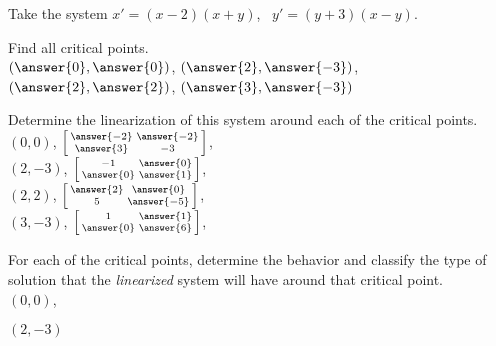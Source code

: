 \documentclass{ximera}
\begin{document}
\begin{exercise}
    Take the system $x' = (x-2)(x+y)$, \ $y' = (y+3)(x-y)$.
    
    Find all critical points.\\
    $\left(\answer{0}, \answer{0}\right)$, $\left(\answer{2}, \answer{-3}\right)$, $\left(\answer{2}, \answer{2}\right)$, $\left(\answer{3}, \answer{-3}\right)$
    \begin{problem}
        Determine the linearization of this system around each of the critical points.\\
            $(0,0)$, $\left[\begin{smallmatrix} \answer{-2} & \answer{-2} \\ \answer{3} & -3 \end{smallmatrix}\right]$, \\ 
            $(2, -3)$, $\left[\begin{smallmatrix} -1 & \answer{0} \\ \answer{0} & \answer{1} \end{smallmatrix}\right]$, \\ 
            $(2, 2)$, $\left[\begin{smallmatrix} \answer{2} & \answer{0} \\ 5 & \answer{-5} \end{smallmatrix}\right]$, \\ 
            $(3, -3)$, $\left[\begin{smallmatrix} 1 & \answer{1} \\ \answer{0} & \answer{6} \end{smallmatrix}\right]$, \\
        \begin{problem}
            For each of the critical points, determine the behavior and classify the type of solution that the  \emph{linearized} system will have around that critical point. \\
            $(0,0)$,  \\
            \begin{multipleChoice}
            \end{multipleChoice}
            $(2, -3)$
            \begin{multipleChoice}

\end{multipleChoice}
\end{problem}
\end{problem}
\end{exercise}
\end{document}
